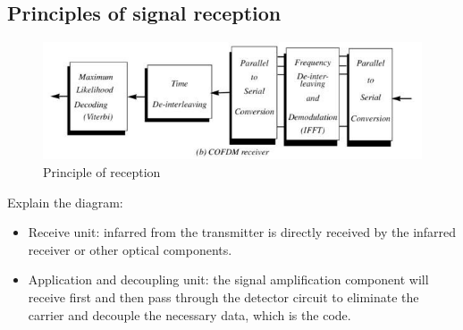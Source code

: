 \documentclass[a4paper]{report}
\begin{document}
    \subsection{Principles of signal reception}
        \begin{figure}[ht]
            \centering
            \includegraphics[width=\linewidth]{receiver.jpg}
            \caption{\label{fig:boat}Principle of reception}
        \end{figure}
        \par Explain the diagram:
        \begin{itemize}
            \item Receive unit: infarred from the transmitter is directly received by the infarred 
            receiver or other optical components.
            \item Application and decoupling unit: the signal amplification component will receive 
            first and then pass through the detector circuit to eliminate the carrier and decouple 
            the necessary data, which is the code.
        \end{itemize}
\end{document}
